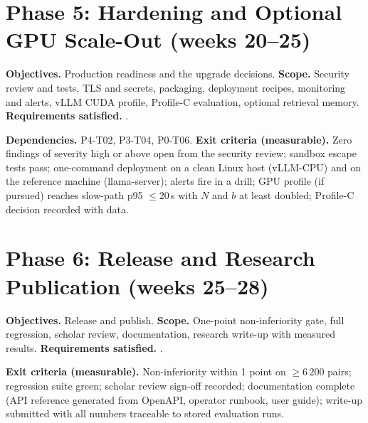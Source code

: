 \documentclass[11pt,a4paper]{article}
\begin{document}
\section{Phase 5: Hardening and Optional GPU Scale-Out (weeks 20--25)}
\textbf{Objectives.} Production readiness and the upgrade decisions. \textbf{Scope.} Security review and tests, TLS and secrets, packaging, deployment recipes, monitoring and alerts, vLLM CUDA profile, Profile-C evaluation, optional retrieval memory. \textbf{Requirements satisfied.} \ReqsPhaseF.
\par\medskip\noindent\TasksPhaseF
\par\medskip\noindent\textbf{Dependencies.} P4-T02, P3-T04, P0-T06. \textbf{Exit criteria (measurable).} Zero findings of severity high or above open from the security review; sandbox escape tests pass; one-command deployment on a clean Linux host (vLLM-CPU) and on the reference machine (llama-server); alerts fire in a drill; GPU profile (if pursued) reaches slow-path p95 $\le20$\,s with $N$ and $b$ at least doubled; Profile-C decision recorded with data.

\section{Phase 6: Release and Research Publication (weeks 25--28)}
\textbf{Objectives.} Release and publish. \textbf{Scope.} One-point non-inferiority gate, full regression, scholar review, documentation, research write-up with measured results. \textbf{Requirements satisfied.} \ReqsPhaseG.
\par\medskip\noindent\TasksPhaseG
\par\medskip\noindent\textbf{Exit criteria (measurable).} Non-inferiority within 1 point on $\ge6\,200$ pairs; regression suite green; scholar review sign-off recorded; documentation complete (API reference generated from OpenAPI, operator runbook, user guide); write-up submitted with all numbers traceable to stored evaluation runs.
\end{document}
